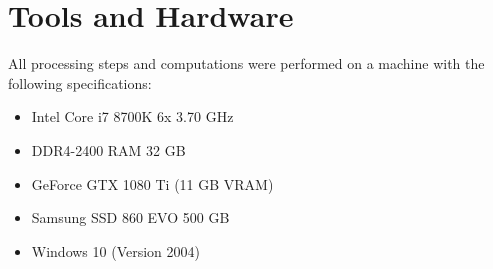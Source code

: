 \section{Tools and Hardware}
\label{app:tools_hardware}

All processing steps and computations were performed on a machine with the following specifications:
\begin{itemize}
    \item Intel Core i7 8700K 6x 3.70 GHz
    \item DDR4-2400 RAM 32 GB
    \item GeForce GTX 1080 Ti (11 GB VRAM)
    \item Samsung SSD 860 EVO 500 GB
    \item Windows 10 (Version 2004)
\end{itemize}

